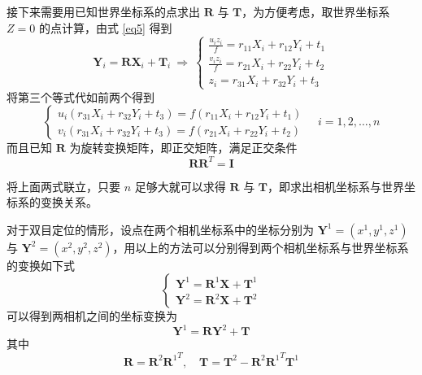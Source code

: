 \documentclass{article}
\numberwithin{equation}{section}						%
\numberwithin{figure}{section}							%
\begin{document}
\begin{sloppypar}
	接下来需要用已知世界坐标系的点求出 ${\bm R}$ 与 ${\bm T}$，为方便考虑，取世界坐标系 $Z = 0$ 的点计算，由式 \ref{eq5} 得到
	\begin{equation}
		{\bm Y_i} = {\bm R}{\bm X_i} + {\bm T_i} \ \Rightarrow \
		\left\lbrace
		\begin{aligned}
			\frac{u_iz_i}{f} = r_{11}X_i + r_{12}Y_i + t_1 \\
			\frac{v_iz_i}{f} = r_{21}X_i + r_{22}Y_i + t_2 \\
			z_i = r_{31}X_i + r_{32}Y_i + t_3
		\end{aligned}
		\right.
	\end{equation}
	将第三个等式代如前两个得到
	\begin{equation}
		\left\lbrace
		\begin{aligned}
			u_i(r_{31}X_i + r_{32}Y_i + t_3) = f(r_{11}X_i + r_{12}Y_i + t_1) \\
			v_i(r_{31}X_i + r_{32}Y_i + t_3) = f(r_{21}X_i + r_{22}Y_i + t_2)
		\end{aligned}
		\right. \quad i = 1, 2, \dots, n
	\end{equation}
	而且已知 $\bm R$ 为旋转变换矩阵，即正交矩阵，满足正交条件
	\begin{equation}
		{\bm R}{\bm R^T} = {\bm I}
	\end{equation}
	
	将上面两式联立，只要 $n$ 足够大就可以求得 ${\bm R}$ 与 ${\bm T}$，即求出相机坐标系与世界坐标系的变换关系。
	
	对于双目定位的情形，设点在两个相机坐标系中的坐标分别为 ${\bm Y^1} = (x^1, y^1, z^1)$ 与 ${\bm Y^2} = (x^2, y^2, z^2)$，用以上的方法可以分别得到两个相机坐标系与世界坐标系的变换如下式
	\begin{equation}
		\left\lbrace
		\begin{aligned}
			{\bm Y^1} = {\bm R^1}{\bm X} + {\bm T^1} \\
			{\bm Y^2} = {\bm R^2}{\bm X} + {\bm T^2}
		\end{aligned}
		\right.
	\end{equation}
	可以得到两相机之间的坐标变换为
	\begin{equation}
		{\bm Y^1} = {\bm R}{\bm Y^2} + {\bm T}
	\end{equation}
	其中
	\begin{equation}
		{\bm R} = {\bm R^2}{\bm R^1}^T, \quad {\bm T} = {\bm T^2} - {\bm R^2}{\bm R^1}^T{\bm T^1}
	\end{equation}

\end{sloppypar}
\end{document}

